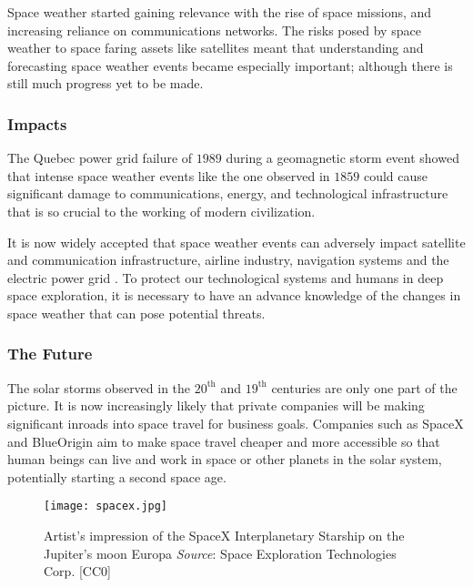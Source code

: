 Space weather started gaining relevance with the rise of space missions, and increasing reliance on 
communications networks. The risks posed by space weather to space faring assets like satellites 
meant that understanding and forecasting space weather events became especially important; although 
there is still much progress yet to be made. 

\subsubsection*{Impacts}

The Quebec power grid failure of $1989$ \citep{kappenman1997geomagnetic} during a geomagnetic storm 
event showed that intense space weather events like the one observed in $1859$ could cause 
significant damage to communications, energy, and technological infrastructure that is so crucial 
to the working of modern civilization.

It is now widely accepted that space weather events can adversely impact satellite and 
communication infrastructure, airline industry, navigation systems and the electric power grid 
\citep{board2009severe,cannon2013extreme,bothmer2007space,baker2004effects}. To protect our 
technological systems and humans in deep space exploration, it is necessary to have an advance 
knowledge of the changes in space weather that can pose potential threats.

\subsubsection*{The Future}

The solar storms observed in the $20^{\text{th}}$ and $19^{\text{th}}$ centuries are only one 
part of the picture. It is now increasingly likely that private companies will be making 
significant inroads into space travel for business goals. Companies such as SpaceX and BlueOrigin 
aim to make space travel cheaper and more accessible so that human beings can live and work in 
space or other planets in the solar system, potentially starting a second space age.


\begin{wrapfigure}{l}{0.4\textwidth}
    \centering\texttt{[image: spacex.jpg]}
    \caption{
        {\small
            Artist's impression of the SpaceX Interplanetary Starship on the Jupiter's moon Europa 
            \textit{Source}: Space Exploration Technologies Corp. [CC0]
        } 
    }
    \label{fig:spacex}
\end{wrapfigure}

